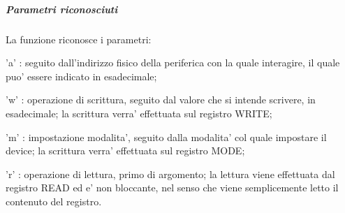 \subparagraph*{Parametri riconosciuti}

La funzione riconosce i parametri\+:
\begin{DoxyItemize}
\item 'a' \+: seguito dall'indirizzo fisico della periferica con la quale interagire, il quale puo' essere indicato in esadecimale;
\item 'w' \+: operazione di scrittura, seguito dal valore che si intende scrivere, in esadecimale; la scrittura verra' effettuata sul registro W\+R\+I\+T\+E;
\item 'm' \+: impostazione modalita', seguito dalla modalita' col quale impostare il device; la scrittura verra' effettuata sul registro M\+O\+D\+E;
\item 'r' \+: operazione di lettura, primo di argomento; la lettura viene effettuata dal registro R\+E\+A\+D ed e' non bloccante, nel senso che viene semplicemente letto il contenuto del registro.
\end{DoxyItemize}